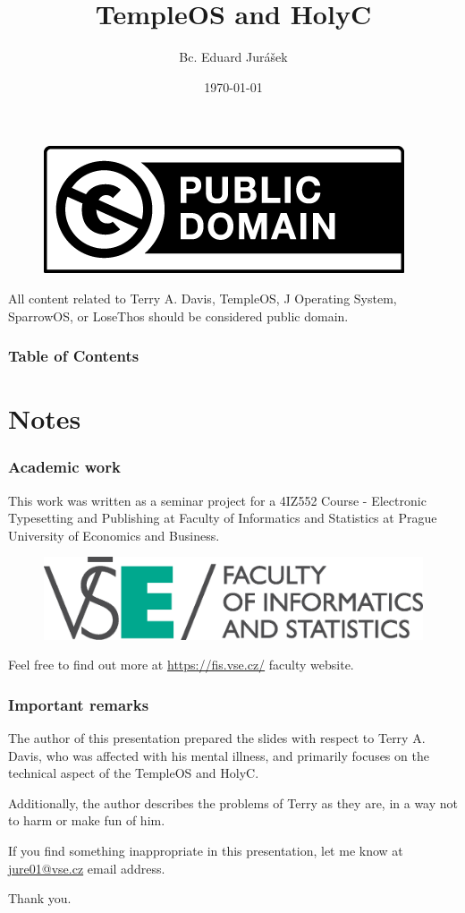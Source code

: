 \documentclass{beamer}
\title{TempleOS and HolyC}
\author{Bc. Eduard Jurášek}
\institute{ FIS VŠE, Prague }
\date{\today}
\begin{document}
	\begin{frame}
		\titlepage

		\begin{figure}
			\centering
			\includegraphics[width=0.2\linewidth]{images/publicdomain.png}
		\end{figure}
		All content related to Terry A. Davis, TempleOS, J Operating System,
		SparrowOS, or LoseThos should be considered public domain.
	\end{frame}

	\begin{frame}
		\frametitle{Table of Contents}
		\begin{multicols}{3}
			\tableofcontents
		\end{multicols}
	\end{frame}

	\section{Notes}
	\begin{frame}
		\frametitle{Academic work}
		This work was written as a seminar project for a 4IZ552 Course - Electronic Typesetting
		and Publishing at Faculty of Informatics and Statistics at Prague University
		of Economics and Business.
		\begin{figure}
			\centering
			\includegraphics[width=0.5\linewidth]{images/FIS_1_logo_cmyk.eps}
		\end{figure}
		Feel free to find out more at \url{https://fis.vse.cz/} faculty website.
	\end{frame}
	\begin{frame}
		\frametitle{Important remarks}
		The author of this presentation prepared the slides with respect to Terry A.
		Davis, who was affected with his mental illness, and primarily focuses on
		the technical aspect of the TempleOS and HolyC.

		Additionally, the author describes the problems of Terry as they are, in a
		way not to harm or make fun of him.

		If you find something inappropriate in this presentation, let me know at \href{mailto:jure01@vse.cz}{jure01@vse.cz}
		email address.

		Thank you.
	\end{frame}
\end{document}
